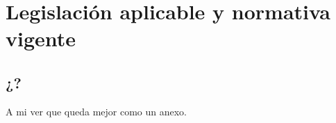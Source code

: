 \chapter{Legislación aplicable y normativa vigente}
\label{cha:regulation}


\section{¿?}

A mi ver que queda mejor como un anexo.